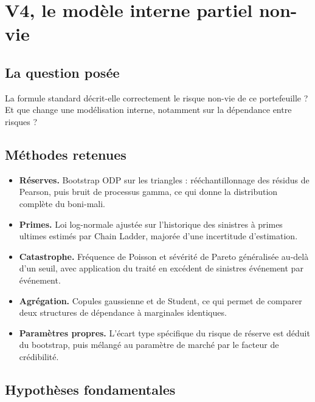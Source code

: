 \documentclass[11pt,a4paper]{article}
\begin{document}
\section{V4, le modèle interne partiel non-vie}

\subsection{La question posée}

La formule standard décrit-elle correctement le risque non-vie de ce portefeuille ? Et que change
une modélisation interne, notamment sur la dépendance entre risques ?

\subsection{Méthodes retenues}

\begin{itemize}
\item \textbf{Réserves.} Bootstrap ODP sur les triangles : rééchantillonnage des résidus de
      Pearson, puis bruit de processus gamma, ce qui donne la distribution complète du boni-mali.
\item \textbf{Primes.} Loi log-normale ajustée sur l'historique des sinistres à primes ultimes
      estimés par Chain Ladder, majorée d'une incertitude d'estimation.
\item \textbf{Catastrophe.} Fréquence de Poisson et sévérité de Pareto généralisée au-delà d'un
      seuil, avec application du traité en excédent de sinistres événement par événement.
\item \textbf{Agrégation.} Copules gaussienne et de Student, ce qui permet de comparer deux
      structures de dépendance à marginales identiques.
\item \textbf{Paramètres propres.} L'écart type spécifique du risque de réserve est déduit du
      bootstrap, puis mélangé au paramètre de marché par le facteur de crédibilité.
\end{itemize}

\subsection{Hypothèses fondamentales}
\end{document}
